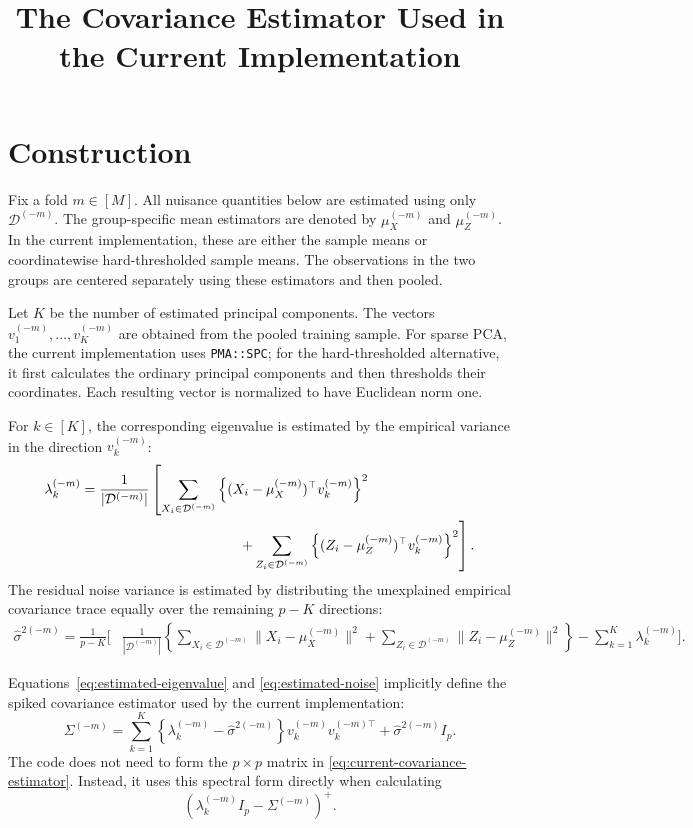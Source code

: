 \documentclass[11pt]{article}
\title{The Covariance Estimator Used in the Current Implementation}
\author{}
\date{}
\begin{document}
\maketitle

\section{Construction}

Fix a fold $m\in[M]$. All nuisance quantities below are estimated using only
$\mathcal D^{(-m)}$. The group-specific mean estimators are denoted by
$\mu_X^{(-m)}$ and $\mu_Z^{(-m)}$. In the current implementation, these are
either the sample means or coordinatewise hard-thresholded sample means.
The observations in the two groups are centered separately using these
estimators and then pooled.

Let $K$ be the number of estimated principal components. The vectors
$v_1^{(-m)},\ldots,v_K^{(-m)}$ are obtained from the pooled training sample.
For sparse PCA, the current implementation uses \texttt{PMA::SPC}; for the
hard-thresholded alternative, it first calculates the ordinary principal
components and then thresholds their coordinates. Each resulting vector is
normalized to have Euclidean norm one.

For $k\in[K]$, the corresponding eigenvalue is estimated by the empirical
variance in the direction $v_k^{(-m)}$:
\begin{align}
\lambda_k^{(-m)}
={}&\frac{1}{|\mathcal D^{(-m)}|}
\left[
\sum_{X_i\in\mathcal D^{(-m)}}
  \left\{(X_i-\mu_X^{(-m)})^\top v_k^{(-m)}\right\}^2
\right.\nonumber\\
&\left.\hspace{35mm}+
\sum_{Z_i\in\mathcal D^{(-m)}}
  \left\{(Z_i-\mu_Z^{(-m)})^\top v_k^{(-m)}\right\}^2
\right].
\label{eq:estimated-eigenvalue}
\end{align}
The residual noise variance is estimated by distributing the unexplained
empirical covariance trace equally over the remaining $p-K$ directions:
\begin{align}
\widehat\sigma^{2(-m)}
=\frac{1}{p-K}\Bigg[
&\frac{1}{|\mathcal D^{(-m)}|}
\left\{
\sum_{X_i\in\mathcal D^{(-m)}}
\|X_i-\mu_X^{(-m)}\|^2
+
\sum_{Z_i\in\mathcal D^{(-m)}}
\|Z_i-\mu_Z^{(-m)}\|^2
\right\}
-\sum_{k=1}^K\lambda_k^{(-m)}
\Bigg].
\label{eq:estimated-noise}
\end{align}

Equations~\eqref{eq:estimated-eigenvalue} and
\eqref{eq:estimated-noise} implicitly define the spiked covariance estimator
used by the current implementation:
\begin{equation}
\Sigma^{(-m)}
=
\sum_{k=1}^K
\left\{\lambda_k^{(-m)}-\widehat\sigma^{2(-m)}\right\}
v_k^{(-m)}v_k^{(-m)\top}
+\widehat\sigma^{2(-m)}I_p.
\label{eq:current-covariance-estimator}
\end{equation}
The code does not need to form the $p\times p$ matrix in
\eqref{eq:current-covariance-estimator}. Instead, it uses this spectral form
directly when calculating
\begin{equation*}
\left(\lambda_k^{(-m)}I_p-\Sigma^{(-m)}\right)^+.
\end{equation*}
\end{document}
